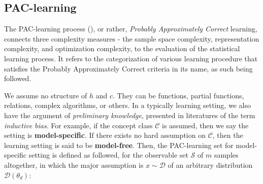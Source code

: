 \documentclass[
  journal=largetwo,
  year=2025,
  volume=37,
]{cup-journal}
\begin{document}
\subsection{PAC-learning}

The PAC-learning process (\cite{10.5555/2621980,10.5555/2371238,STL_Hajek_Maxim_2021}), or rather, \textit{Probably Approximately Correct} learning, connects three complexity measures - the sample space complexity, representation complexity, and optimization complexity, to the evaluation of the statistical learning process. It refers to the categorization of various learning procedure that satisfies the Probably Approximately Correct criteria in its name, as such being followed. 

We assume no structure of $h$ and $c$. They can be functions, partial functions, relations, complex algorithms, or others. In a typically learning setting, we also have the argument of \textit{preliminary knowledge}, presented in literatures of the term \textit{inductive bias}. For example, if the concept class $\mathcal{C}$ is assumed, then we say the setting is \textbf{model-specific}. If there exists no hard assumption on $\mathcal{C}$, then the learning setting is said to be \textbf{model-free}. Then, the PAC-learning set for model-specific setting is defined as followed, for the observable set $\mathcal{S}$ of $m$ samples altogether, in which the major assumption is $x\sim\mathcal{D}$ of an arbitrary distribution $\mathcal{D}(\theta_{d})$:
\end{document}
